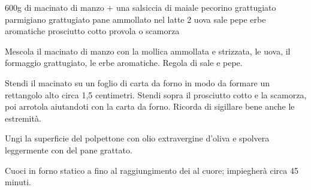 \begin{ingreds}
	600g di macinato di manzo + una salsiccia di maiale
	pecorino grattugiato
	parmigiano grattugiato
	pane ammollato nel latte
	2 uova
	sale
	pepe
	erbe aromatiche
	prosciutto cotto
	provola o scamorza
\end{ingreds}

\begin{method}
	Mescola il macinato di manzo con la mollica ammollata e strizzata, le uova, il formaggio grattugiato, le erbe aromatiche. Regola di sale e pepe.

	Stendi il macinato su un foglio di carta da forno in modo da formare un rettangolo alto circa 1,5 centimetri. Stendi sopra il prosciutto cotto e la scamorza, poi arrotola aiutandoti con la carta da forno. Ricorda di sigillare bene anche le estremità.

	Ungi la superficie del polpettone con olio extravergine d'oliva e spolvera leggermente con del pane grattato.

	Cuoci in forno statico a  fino al raggiungimento dei  al cuore; impiegherà circa 45 minuti.
\end {method}


